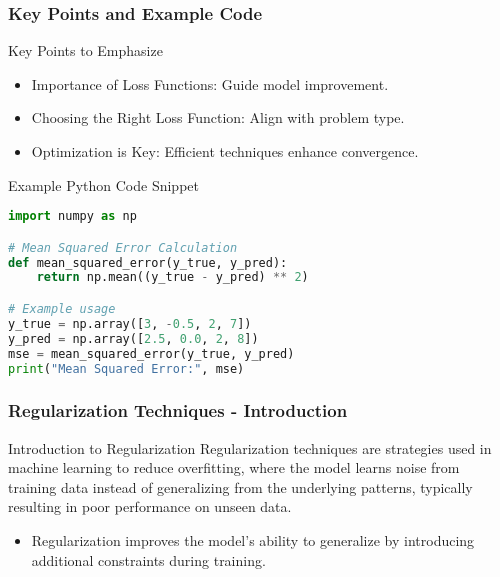 \documentclass[aspectratio=169]{beamer}
\begin{document}
\begin{frame}[fragile]
    \frametitle{Key Points and Example Code}
    \begin{block}{Key Points to Emphasize}
        \begin{itemize}
            \item Importance of Loss Functions: Guide model improvement.
            \item Choosing the Right Loss Function: Align with problem type.
            \item Optimization is Key: Efficient techniques enhance convergence.
        \end{itemize}
    \end{block}

    \begin{block}{Example Python Code Snippet}
\begin{lstlisting}[language=Python]
import numpy as np

# Mean Squared Error Calculation
def mean_squared_error(y_true, y_pred):
    return np.mean((y_true - y_pred) ** 2)

# Example usage
y_true = np.array([3, -0.5, 2, 7])
y_pred = np.array([2.5, 0.0, 2, 8])
mse = mean_squared_error(y_true, y_pred)
print("Mean Squared Error:", mse)
\end{lstlisting}
    \end{block}
\end{frame}

\begin{frame}[fragile]
    \frametitle{Regularization Techniques - Introduction}
    \begin{block}{Introduction to Regularization}
        Regularization techniques are strategies used in machine learning to reduce overfitting, where the model learns noise from training data instead of generalizing from the underlying patterns, typically resulting in poor performance on unseen data. 
    \end{block}
    \begin{itemize}
        \item Regularization improves the model's ability to generalize by introducing additional constraints during training.
    \end{itemize}
\end{frame}
\end{document}
